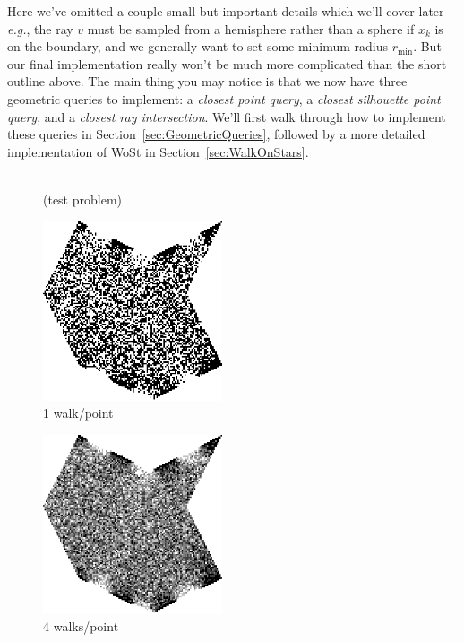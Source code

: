 \documentclass{article}
\newcommand{\figlabel}[1]{\textsf{#1}}
\newcommand{\eg}{\emph{e.g.}} %
\renewcommand{\vec}[1]{#1}
\begin{document}
Here we've omitted a couple small but important details which we'll cover later---\eg{}, the ray \(\vec{v}\) must be sampled from a hemisphere rather than a sphere if \(\vec{x}_k\) is on the boundary, and we generally want to set some minimum radius \(r_{\min}\).  But our final implementation really won't be much more complicated than the short outline above.  The main thing you may notice is that we now have three geometric queries to implement: a \emph{closest point query}, a \emph{closest silhouette point query}, and a \emph{closest ray intersection}.  We'll first walk through how to implement these queries in Section~\ref{sec:GeometricQueries}, followed by a more detailed implementation of WoSt in Section~\ref{sec:WalkOnStars}.

\begin{figure}[h!]
   \centering
   \begin{minipage}{150pt}
      \centering
       \\
      \figlabel{(test problem)}
   \end{minipage}
   \begin{minipage}{150pt}
      \centering
      \includegraphics[width=150pt]{images/WoSt-1wpp.png} \\
      \figlabel{1 walk/point}
   \end{minipage}
   \begin{minipage}{150pt}
      \centering
      \includegraphics[width=150pt]{images/WoSt-4wpp.png} \\
      \figlabel{4 walks/point}
   \end{minipage}


\end{figure}
\end{document}
